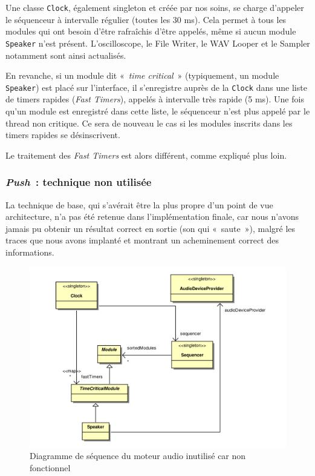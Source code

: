 Une classe \verb!Clock!, également singleton et créée par nos
soins, se charge d'appeler le séquenceur à intervalle régulier
(toutes les 30 ms). Cela permet à tous les modules qui ont besoin
d'être rafraîchis d'être appelés, même si aucun module
\verb!Speaker! n'est présent. L'oscilloscope, le File Writer, le
WAV Looper et le Sampler notamment sont ainsi actualisés.

En revanche, si un module dit «~\emph{time critical}~»
(typiquement, un module \verb!Speaker!) est placé sur l'interface,
il s'enregistre auprès de la \verb!Clock! dans une liste de timers
rapides (\emph{Fast Timers}), appelés à intervalle très rapide (5
ms). Une fois qu'un module est enregistré dans cette liste, le
séquenceur n'est plus appelé par le thread non critique. Ce sera de nouveau le
cas si les modules inscrits dans les timers rapides se
désinscrivent.

Le traitement des \emph{Fast Timers} est alors différent, comme
expliqué plus loin.

\subsubsection{\emph{Push}~: technique non utilisée}

La technique de base, qui s'avérait être la plus propre d'un point
de vue architecture, n'a pas été retenue dans l'implémentation
finale, car nous n'avons jamais pu obtenir un résultat correct en
sortie (son qui «~saute~»), malgré les traces que nous avons
implanté et montrant un acheminement correct des informations.

\begin{figure}[ht]
\centering
\includegraphics[width=17cm]{../img/ps/psm_unusedAudioEngine.pdf}
\caption{Diagramme de séquence du moteur audio inutilisé car non fonctionnel}
\label{fig:unused-audioengine}
\end{figure}

